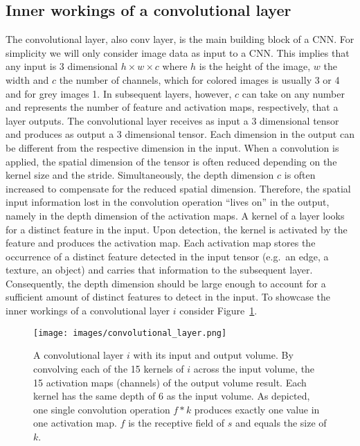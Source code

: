 \documentclass[a4paper,12pt]{report}
\begin{document}
\subsection{Inner workings of a convolutional layer}\label{subsec:innerworkconvl}
The convolutional layer, also conv layer, is the main building block of a CNN. For simplicity we will only consider image data as input to a CNN. This implies that any input is 3 dimensional $h \times w \times c$ where $h$ is the height of the image, $w$ the width and $c$ the number of channels, which for colored images is usually 3 or 4 and for grey images 1.  In subsequent layers, however, $c$ can take on any number and represents the number of feature and activation maps, respectively, that a layer outputs. The convolutional layer receives as input a 3 dimensional tensor and produces as output a 3 dimensional tensor. Each dimension in the output can be different from the respective dimension in the input. When a convolution is applied, the spatial dimension of the tensor is often reduced depending on the kernel size and the stride. Simultaneously, the depth dimension $c$ is often increased to compensate for the reduced spatial dimension. Therefore, the spatial input information lost in the convolution operation ``lives on'' in the output, namely in the depth dimension of the activation maps. A kernel of a layer looks for a distinct feature in the input. Upon detection, the kernel is activated by the feature and produces the activation map. Each activation map stores the occurrence of a distinct feature detected in the input tensor (e.g.\ an edge, a texture, an object) and carries that information to the subsequent layer. Consequently, the depth dimension should be large enough to account for a sufficient amount of distinct features to detect in the input. To showcase the inner workings of a convolutional layer $i$ consider Figure~\ref{fig:conv_layer}. 
\begin{figure}[ht]
\centering
\texttt{[image: images/convolutional\_layer.png]}
\caption{A convolutional layer $i$ with its input and output volume. By convolving each of the 15 kernels of $i$ across the input volume, the 15 activation maps (channels) of the output volume result. Each kernel has the same depth of 6 as the input volume. As depicted, one single convolution operation $f * k$ produces exactly one value in one activation map. $f$ is the receptive field of $s$ and equals the size of $k$.}
\label{fig:conv_layer}
\end{figure}
\end{document}
